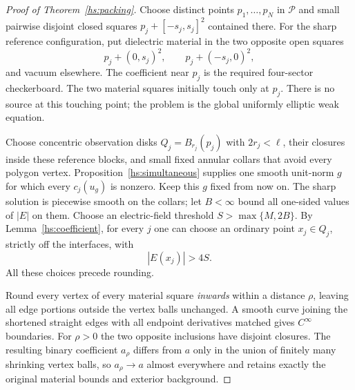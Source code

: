 \begin{proof}[Proof of Theorem~\ref{hs:packing}]
Choose distinct points $p_1,\ldots,p_N$ in $\mathcal P$ and small
pairwise disjoint closed squares $p_j+[-s_j,s_j]^2$ contained there.
For the sharp reference configuration, put dielectric material in
the two opposite open squares
\begin{equation}
 p_j+(0,s_j)^2,
 \qquad p_j+(-s_j,0)^2,
 \label{hs:square-geometry}
\end{equation}
and vacuum elsewhere.  The coefficient near $p_j$ is the required
four-sector checkerboard.  The two material squares initially
touch only at $p_j$.  There is no source at this touching point;
the problem is the global uniformly elliptic weak equation.

Choose concentric observation disks $Q_j=B_{r_j}(p_j)$ with
$2r_j<\ell$, their closures inside these reference blocks, and
small fixed annular collars that avoid every polygon vertex.
Proposition~\ref{hs:simultaneous} supplies one smooth unit-norm $g$
for which every $c_j(u_g)$ is nonzero.  Keep this $g$ fixed from
now on.  The sharp solution is piecewise smooth on the collars;
let $B<\infty$ bound all one-sided values of $|E|$ on them.
Choose an electric-field threshold $S>\max\{M,2B\}$.
By Lemma~\ref{hs:coefficient}, for every $j$ one can choose an
ordinary point $x_j\in Q_j$, strictly off the interfaces, with
\begin{equation}
 |E(x_j)|>4S.
 \label{hs:selected-values}
\end{equation}
All these choices precede rounding.

Round every vertex of every material square \emph{inwards} within
a distance $\rho$, leaving all edge portions outside the vertex
balls unchanged.  A smooth curve joining the shortened straight
edges with all endpoint derivatives matched gives $C^\infty$
boundaries.  For $\rho>0$ the two opposite inclusions have disjoint
closures.  The resulting binary coefficient $a_\rho$ differs from
$a$ only in the union of finitely many shrinking vertex balls, so
$a_\rho\to a$ almost everywhere and retains exactly the original
material bounds and exterior background.


\end{proof}
